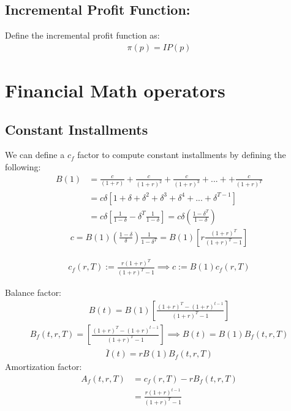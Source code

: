 \documentclass[12pt]{book}
\begin{document}
\subsection{ Incremental Profit Function: }
Define the incremental profit function as:
\begin{align}
\pi(p)=IP(p)
\end{align}
\section{Financial Math operators}
\subsection{Constant Installments}
We can define a $c_f$ factor to compute constant installments by defining the following:
\begin{align}
    B(1) &= \frac{c}{(1+r)}+\frac{c}{(1+r)^2}+\frac{c}{(1+r)^3}+...++\frac{c}{(1+r)^T} \nonumber\\
    &=c\delta[1+\delta+\delta^2+\delta^3+\delta^4+...+\delta^{T-1}] \nonumber \\
    &=c\delta\left[\frac{1}{1-\delta}-\delta^T\frac{1}{1-\delta}\right] =c\delta\left(\frac{1-\delta^T}{1-\delta}\right)
\end{align}
\begin{align}
    c=B(1)\left(\frac{1-\delta}{\delta}\right)\frac{1}{1-\delta^T}=B(1)\left[r\frac{(1+r)^T}{(1+r)^T-1}\right]
\end{align}

\begin{align}
    c_f(r,T):=\frac{r(1+r)^T}{(1+r)^T-1} \implies c:=B(1)c_f(r,T)
\end{align}

Balance factor:
\begin{align}
    B(t)=B(1)\left[ \frac{(1+r)^T-(1+r)^{t-1}}{(1+r)^T-1} \right]
\end{align}
\begin{align}
    B_f(t,r,T)=\left[ \frac{(1+r)^T-(1+r)^{t-1}}{(1+r)^T-1} \right] \implies B(t)=B(1)B_f(t,r,T)
\end{align}
\begin{align}
    \bar{I}(t) = rB(1)B_f(t,r,T)
\end{align}
Amortization factor:
\begin{align}
    A_f(t,r,T) &= c_f(r,T)-rB_f(t,r,T)\\
    &=\frac{r(1+r)^{t-1}}{(1+r)^T-1}
\end{align}
\end{document}
